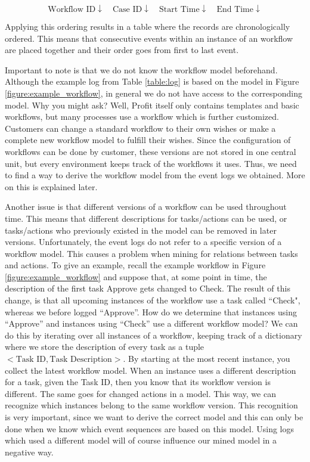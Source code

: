 \documentclass[a4paper,11pt]{article}
\begin{document}
\begin{equation}
\text{Workflow ID} \downarrow \quad \text{Case ID} \downarrow \quad \text{Start Time} \downarrow \quad \text{End Time} \downarrow
\end{equation}

Applying this ordering results in a table where the records are chronologically ordered. This means that consecutive events within an instance of an workflow are placed together and their order goes from first to last event. 

Important to note is that we do not know the workflow model beforehand. Although the example log from Table \ref{table:log} is based on the model in Figure \ref{figure:example_workflow}, in general we do not have access to the corresponding model. Why you might ask? Well, Profit itself only contains templates and basic workflows, but many processes use a workflow which is further customized. Customers can change a standard workflow to their own wishes or make a complete new workflow model to fulfill their wishes. Since the configuration of workflows can be done by customer, these versions are not stored in one central unit, but every environment keeps track of the workflows it uses. Thus, we need to find a way to derive the workflow model from the event logs we obtained. More on this is explained later.

Another issue is that different versions of a workflow can be used throughout time. This means that different descriptions for tasks/actions can be used, or tasks/actions who previously existed in the model can be removed in later versions. Unfortunately, the event logs do not refer to a specific version of a workflow model. This causes a problem when mining for relations between tasks and actions. To give an example, recall the example workflow in Figure \ref{figure:example_workflow} and suppose that, at some point in time, the description of the first task Approve gets changed to Check. The result of this change, is that all upcoming instances of the workflow use a task called ``Check", whereas we before logged ``Approve''. How do we determine that instances using ``Approve'' and instances using ``Check'' use a different workflow model? We can do this by iterating over all instances of a workflow, keeping track of a dictionary where we store the description of every task as a tuple $<\text{Task ID}, \text{Task Description}>$. By starting at the most recent instance, you collect the latest workflow model. When an instance uses a different description for a task, given the Task ID, then you know that its workflow version is different. The same goes for changed actions in a model. This way, we can recognize which instances belong to the same workflow version. This recognition is very important, since we want to derive the correct model and this can only be done when we know which event sequences are based on this model. Using logs which used a different model will of course influence our mined model in a negative way.
\end{document}
